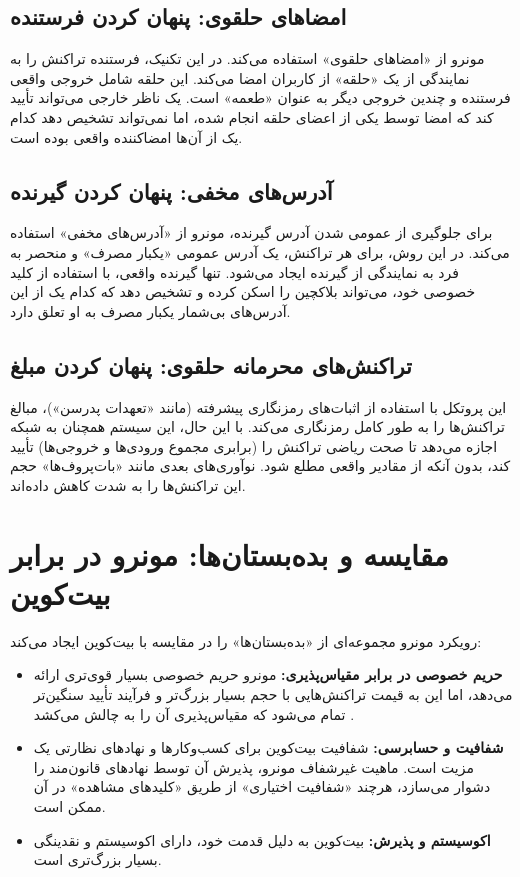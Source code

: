 \subsection{امضاهای حلقوی: پنهان کردن فرستنده}
مونرو از «امضاهای حلقوی» استفاده می‌کند. در این تکنیک، فرستنده تراکنش را به نمایندگی از یک «حلقه» از کاربران امضا می‌کند. این حلقه شامل خروجی واقعی فرستنده و چندین خروجی دیگر به عنوان «طعمه» است. یک ناظر خارجی می‌تواند تأیید کند که امضا توسط یکی از اعضای حلقه انجام شده، اما نمی‌تواند تشخیص دهد کدام یک از آن‌ها امضاکننده واقعی بوده است.

\subsection{آدرس‌های مخفی: پنهان کردن گیرنده}
برای جلوگیری از عمومی شدن آدرس گیرنده، مونرو از «آدرس‌های مخفی» استفاده می‌کند. در این روش، برای هر تراکنش، یک آدرس عمومی «یکبار مصرف» و منحصر به فرد به نمایندگی از گیرنده ایجاد می‌شود. تنها گیرنده واقعی، با استفاده از کلید خصوصی خود، می‌تواند بلاکچین را اسکن کرده و تشخیص دهد که کدام یک از این آدرس‌های بی‌شمار یکبار مصرف به او تعلق دارد.

\subsection{تراکنش‌های محرمانه حلقوی: پنهان کردن مبلغ}
این پروتکل با استفاده از اثبات‌های رمزنگاری پیشرفته (مانند «تعهدات پدرسن»)، مبالغ تراکنش‌ها را به طور کامل رمزنگاری می‌کند. با این حال، این سیستم همچنان به شبکه اجازه می‌دهد تا صحت ریاضی تراکنش را (برابری مجموع ورودی‌ها و خروجی‌ها) تأیید کند، بدون آنکه از مقادیر واقعی مطلع شود. نوآوری‌های بعدی مانند «بات‌پروف‌ها» حجم این تراکنش‌ها را به شدت کاهش داده‌اند.

\section{مقایسه و بده‌بستان‌ها: مونرو در برابر بیت‌کوین}

رویکرد مونرو مجموعه‌ای از «بده‌بستان‌ها» را در مقایسه با بیت‌کوین ایجاد می‌کند:
\begin{itemize}
	\item \textbf{حریم خصوصی در برابر مقیاس‌پذیری:} مونرو حریم خصوصی بسیار قوی‌تری ارائه می‌دهد، اما این به قیمت تراکنش‌هایی با حجم بسیار بزرگ‌تر و فرآیند تأیید سنگین‌تر تمام می‌شود که مقیاس‌پذیری آن را به چالش می‌کشد \cite{antonopoulos_mastering}.
	
	\item \textbf{شفافیت و حسابرسی:} شفافیت بیت‌کوین برای کسب‌وکارها و نهادهای نظارتی یک مزیت است. ماهیت غیرشفاف مونرو، پذیرش آن توسط نهادهای قانون‌مند را دشوار می‌سازد، هرچند «شفافیت اختیاری» از طریق «کلیدهای مشاهده» در آن ممکن است.
	
	\item \textbf{اکوسیستم و پذیرش:} بیت‌کوین به دلیل قدمت خود، دارای اکوسیستم و نقدینگی بسیار بزرگ‌تری است.
\end{itemize}

